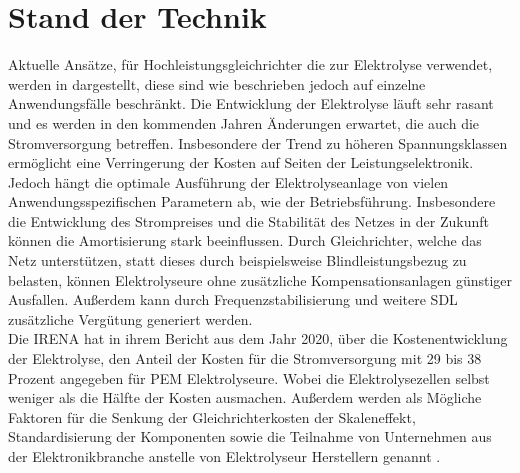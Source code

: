 \section{Stand der Technik}
Aktuelle Ansätze, für Hochleistungsgleichrichter die zur Elektrolyse verwendet, werden in \cite{HydrogenRectifier} dargestellt, diese sind wie beschrieben jedoch auf einzelne Anwendungsfälle beschränkt. Die Entwicklung der Elektrolyse läuft sehr rasant und es werden in den kommenden Jahren Änderungen erwartet, die auch die Stromversorgung betreffen. Insbesondere der Trend zu höheren Spannungsklassen ermöglicht eine Verringerung der Kosten auf Seiten der Leistungselektronik. Jedoch hängt die optimale Ausführung der Elektrolyseanlage von vielen Anwendungsspezifischen Parametern ab, wie der Betriebsführung. Insbesondere die Entwicklung des Strompreises und die Stabilität des Netzes in der Zukunft können die Amortisierung stark beeinflussen. Durch Gleichrichter, welche das Netz unterstützen, statt dieses durch beispielsweise Blindleistungsbezug zu belasten, können Elektrolyseure ohne zusätzliche Kompensationsanlagen günstiger Ausfallen. Außerdem kann durch Frequenzstabilisierung und weitere \gls{SDL} zusätzliche Vergütung generiert werden. \\
Die \gls{IRENA} hat in ihrem Bericht aus dem Jahr 2020, über die Kostenentwicklung der Elektrolyse, den Anteil der Kosten für die Stromversorgung mit 29 bis 38 Prozent angegeben für \gls{PEM} Elektrolyseure. Wobei die Elektrolysezellen selbst weniger als die Hälfte der Kosten ausmachen. Außerdem werden als Mögliche Faktoren für die Senkung der Gleichrichterkosten der Skaleneffekt, Standardisierung der Komponenten sowie die Teilnahme von Unternehmen aus der Elektronikbranche anstelle von Elektrolyseur Herstellern genannt \cite{IRENA2020}.\\ 
